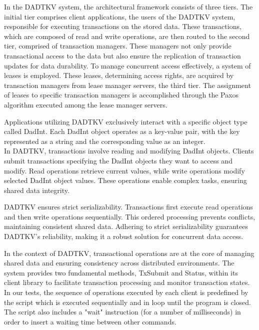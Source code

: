 \documentclass[times, 10pt,twocolumn]{article}
\begin{document}
In the DADTKV system, the architectural framework consists of three tiers. 
The initial tier comprises client applications, the users of the DADTKV system, 
responsible for executing transactions on the stored data. These transactions, 
which are composed of read and write operations, are then routed to the second 
tier, comprised of transaction managers. These managers not only provide transactional 
access to the data but also ensure the replication of transaction updates for data 
durability. To manage concurrent access effectively, a system of leases is employed. 
These leases, determining access rights, are acquired by transaction managers from 
lease manager servers, the third tier. The assignment of leases to specific 
transaction managers is accomplished through the Paxos algorithm executed among 
the lease manager servers.


Applications utilizing DADTKV exclusively interact with a specific object type 
called DadInt. Each DadInt object operates as a key-value pair, with the key 
represented as a string and the corresponding value as an integer.\\

In DADTKV, transactions involve reading and modifying DadInt objects. Clients 
submit transactions specifying the DadInt objects they want to access and 
modify. Read operations retrieve current values, while write operations 
modify selected DadInt object values. These operations enable complex tasks, 
ensuring shared data integrity.

DADTKV ensures strict serializability. Transactions first execute 
read operations and then write operations sequentially. This ordered processing 
prevents conflicts, maintaining consistent shared data. Adhering to strict 
serializability guarantees DADTKV's reliability, making it a robust solution for 
concurrent data access.\\


In the context of DADTKV, transactional operations are at the core of managing 
shared data and ensuring consistency across distributed environments. The system 
provides two fundamental methods, TxSubmit and Status, within its client library 
to facilitate transaction processing and monitor transaction states. In our tests, the sequence 
of operations executed by each client is predefined by the script which is executed 
sequentially and in loop until the program is closed. The script also includes a 
"wait" instruction (for a number of milliseconds) in order to insert a waiting time 
between other commands.
\end{document}
